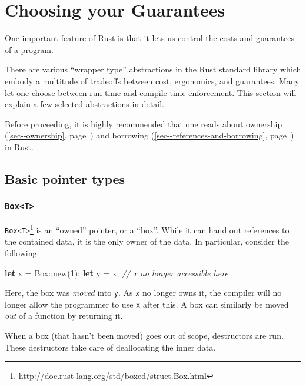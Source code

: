 \documentclass[a4paper,]{book}
\renewcommand*{\hyperref}[2][\ar]{%
  \def\ar{#2}%
  #2 (\autoref{#1}, page~\pageref{#1})}
\newenvironment{Shaded}{\begin{snugshade}}{\end{snugshade}}
\newcommand{\KeywordTok}[1]{\textcolor[rgb]{0.13,0.29,0.53}{\textbf{{#1}}}}
\newcommand{\DecValTok}[1]{\textcolor[rgb]{0.00,0.00,0.81}{{#1}}}
\newcommand{\CommentTok}[1]{\textcolor[rgb]{0.56,0.35,0.01}{\textit{{#1}}}}
\newcommand{\NormalTok}[1]{{#1}}
\renewcommand{\href}[2]{#2\footnote{\url{#1}}}
\begin{document}
\section{Choosing your Guarantees}\label{sec--choosing-your-guarantees}

One important feature of Rust is that it lets us control the costs and
guarantees of a program.

There are various ``wrapper type'' abstractions in the Rust standard
library which embody a multitude of tradeoffs between cost, ergonomics,
and guarantees. Many let one choose between run time and compile time
enforcement. This section will explain a few selected abstractions in
detail.

Before proceeding, it is highly recommended that one reads about
\hyperref[sec--ownership]{ownership} and
\hyperref[sec--references-and-borrowing]{borrowing} in Rust.

\subsection{Basic pointer types}\label{basic-pointer-types}

\subsubsection{\texorpdfstring{\texttt{Box\textless{}T\textgreater{}}}{Box\textless{}T\textgreater{}}}\label{boxt}

\href{http://doc.rust-lang.org/std/boxed/struct.Box.html}{\texttt{Box\textless{}T\textgreater{}}}
is an ``owned'' pointer, or a ``box''. While it can hand out references
to the contained data, it is the only owner of the data. In particular,
consider the following:

\begin{Shaded}
\begin{Highlighting}[]
\KeywordTok{let} \NormalTok{x = Box::new(}\DecValTok{1}\NormalTok{);}
\KeywordTok{let} \NormalTok{y = x;}
\CommentTok{// x no longer accessible here}
\end{Highlighting}
\end{Shaded}

Here, the box was \emph{moved} into \texttt{y}. As \texttt{x} no longer
owns it, the compiler will no longer allow the programmer to use
\texttt{x} after this. A box can similarly be moved \emph{out} of a
function by returning it.

When a box (that hasn't been moved) goes out of scope, destructors are
run. These destructors take care of deallocating the inner data.
\end{document}
